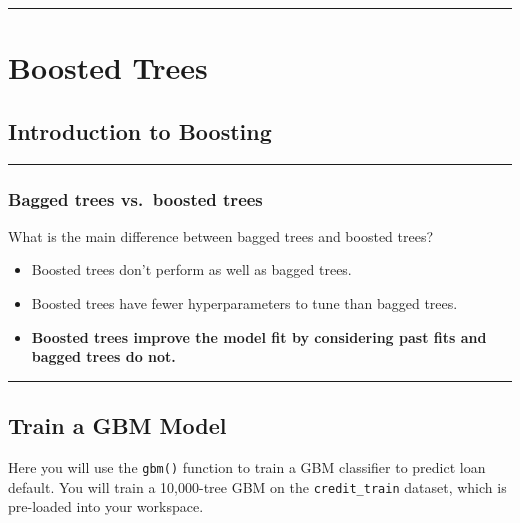 \documentclass[
]{book}
\begin{document}
\begin{center}\rule{0.5\linewidth}{0.5pt}\end{center}

\hypertarget{boosted-trees}{%
\chapter{Boosted Trees}\label{boosted-trees}}

\hypertarget{introduction-to-boosting}{%
\section{Introduction to Boosting}\label{introduction-to-boosting}}

\begin{center}\rule{0.5\linewidth}{0.5pt}\end{center}

\hypertarget{bagged-trees-vs.-boosted-trees}{%
\subsection{Bagged trees vs.~boosted trees}\label{bagged-trees-vs.-boosted-trees}}

What is the main difference between bagged trees and boosted trees?

\begin{itemize}
\item
  Boosted trees don't perform as well as bagged trees.
\item
  Boosted trees have fewer hyperparameters to tune than bagged trees.
\item
  \textbf{Boosted trees improve the model fit by considering past fits and bagged trees do not.}
\end{itemize}

\begin{center}\rule{0.5\linewidth}{0.5pt}\end{center}

\hypertarget{train-a-gbm-model}{%
\section{Train a GBM Model}\label{train-a-gbm-model}}

Here you will use the \texttt{gbm()} function to train a GBM classifier to predict loan default. You will train a 10,000-tree GBM on the \texttt{credit\_train} dataset, which is pre-loaded into your workspace.
\end{document}
